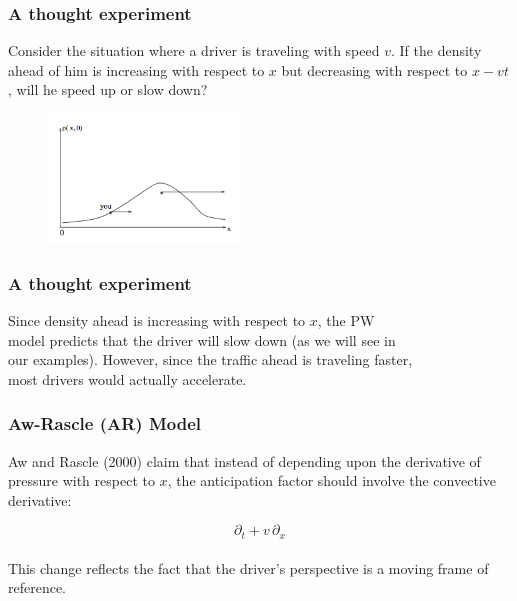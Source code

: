 \documentclass{beamer}
\begin{document}

\begin{frame}
\frametitle{A thought experiment}

Consider the situation where a driver is traveling with speed $v$.  If the density ahead of him is increasing with respect to $x$ but decreasing with respect to $x - vt$, will he speed up or slow down?

\begin{figure}
\centering
\includegraphics[width=2in]{experiment.png}
\end{figure}

\end{frame}

\begin{frame}
\frametitle{A thought experiment}

\hspace{2em} Since density ahead is increasing with respect to $x$, the PW \\
\hspace{2em} model predicts that the driver will slow down (as we will see in \\
\hspace{2em} our examples).  However, since the traffic ahead is traveling faster, \\
\hspace{2em} most drivers would actually accelerate.

\end{frame}

\begin{frame}
\frametitle{Aw-Rascle (AR) Model}

Aw and Rascle (2000) claim that instead of depending upon the derivative of pressure with respect to $x$, the anticipation factor should involve the convective derivative:

\[ \partial_t + v \, \partial_x \] \\[5ex]

This change reflects the fact that the driver's perspective is a moving frame of reference.

\end{frame}
\end{document}
